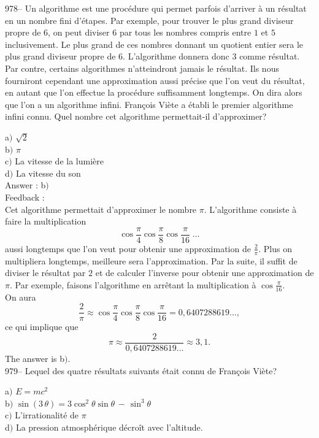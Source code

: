 \documentclass[letterpaper, 12pt]{article}
\begin{document}
978-- Un algorithme est une proc\'edure qui permet parfois d'arriver
\`a un r\'esultat en un nombre fini d'\'etapes. Par exemple, pour
trouver le plus grand diviseur propre de $6$, on peut diviser $6$
par tous les nombres compris entre $1$ et $5$ inclusivement. Le plus
grand de ces nombres donnant un quotient entier sera le plus grand
diviseur propre de $6$. L'algorithme donnera donc $3$ comme
r\'esultat. Par contre, certains algorithmes n'atteindront jamais le
r\'esultat. Ils nous fourniront cependant une approximation aussi
pr\'ecise que l'on veut du r\'esultat, en autant que l'on effectue
la proc\'edure suffisamment longtemps. On dira alors que l'on a un
algorithme infini. Fran\c cois Vi\`ete a \'etabli le premier
algorithme infini connu. Quel nombre cet algorithme permettait-il
d'approximer?

a$)$ $\sqrt2$ \\
b$)$ $\pi$ \\
c$)$ La vitesse de la lumi\`ere \\
d$)$ La vitesse du son\\

Answer : b$)$\\

Feedback : \\
Cet algorithme permettait d'approximer le nombre $\pi$. L'algorithme
consiste \`a faire la multiplication
$$\displaystyle{\cos\frac{\pi}4\cos\frac{\pi}8\cos\frac{\pi}{16}\;\ldots}$$
aussi longtemps que l'on veut pour obtenir une approximation de
$\frac2{\pi}$. Plus on multipliera longtemps, meilleure sera
l'approximation. Par la suite, il suffit de diviser le r\'esultat
par $2$ et de calculer l'inverse
pour obtenir une approximation de $\pi$. Par exemple, faisons l'algorithme
en arr\^etant la multiplication \`a $\cos\frac{\pi}{16}$.\\
On aura
$$
\displaystyle{\frac2{\pi}}  \approx
\displaystyle{\cos\frac{\pi}4\cos\frac{\pi}8\cos\frac{\pi}{16}}
                               =     0,640 728 861 9\ldots,
$$
ce qui implique que
$$
\pi  \approx  \displaystyle{\frac2{0,640 728 861 9\ldots}}
     \approx  3,1.
$$
The answer is b$)$.\\

979-- Lequel des quatre r\'esultats suivants \'etait connu de Fran\c
cois Vi\`ete?

a$)$ $E=mc^2$\\
b$)$ $\sin(3\,\theta)=3\cos^2\theta\sin\theta\,-\,\sin^3\theta$ \\
c$)$ L'irrationalit\'e de $\pi$ \\
d$)$ La pression atmosph\'erique d\'ecro\^it avec l'altitude.\\
\end{document}
